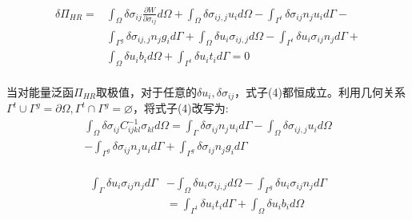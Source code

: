 \documentclass[11pt,a4paper]{article}
\begin{document}
\begin{displaymath}
\begin{equation}
\begin{split} 
    \delta \Pi_{H\!R}=&\int_{\Omega}\delta\sigma_{ij}\frac{\partial W}{\partial \sigma_{ij}}d\Omega+
    \int_{\Omega}\delta\sigma_{ij,j}u_id\Omega-\int_{\Gamma^t}\delta\sigma_{ij}n_ju_id\Gamma-\\
    &\int_{\Gamma^g}\delta\sigma_{ij,j}n_jg_id\Gamma+\int_{\Omega}\delta u_i\sigma_{ij,j}d\Omega- \int_{\Gamma^t}\delta u_i\sigma_{ij}n_jd\Gamma+\\
    &\int_{\Omega}\delta u_ib_id\Omega+\int_{\Gamma^t}\delta u_it_id\Gamma
    =0
\end{split}
\end{equation}
\end{displaymath}\\

 当对能量泛函$\Pi_{H\!R}$取极值，对于任意的$\delta u_i,\delta \sigma_{ij}$，式子(4)都恒成立。利用几何关系$\Gamma^t\cup\Gamma^g=\partial\Omega,\Gamma^t\cap\Gamma^g=\varnothing$，将式子(4)改写为:
\begin{displaymath}
\begin{equation}
\begin{split}
\int_{\Omega}\delta\sigma_{ij}C^{-1}_{ijkl}\sigma_{kl}d\Omega=\int_{\Gamma}\delta\sigma_{ij}n_ju_id\Gamma-\int_{\Omega}\delta\sigma_{ij,j}u_id\Omega\\
-\int_{\Gamma^g}\delta\sigma_{ij}n_ju_id\Gamma+\int_{\Gamma^g}\delta\sigma_{ij}n_jg_id\Gamma\\
\end{split}
\end{equation} 
\end{displaymath}

\begin{displaymath}
\begin{equation}
\begin{split}
 \int_{\Gamma}\delta u_i\sigma_{ij}n_jd\Gamma&-\int_{\Omega}\delta u_i\sigma_{ij,j}d\Omega-\int_{\Gamma^g}\delta u_i\sigma_{ij}n_jd\Gamma\\
 &=\int_{\Gamma^t}\delta u_it_id\Gamma+\int_{\Omega}\delta u_ib_id\Omega
 \end{split}
\end{equation} 
\end{displaymath}
\end{document}
